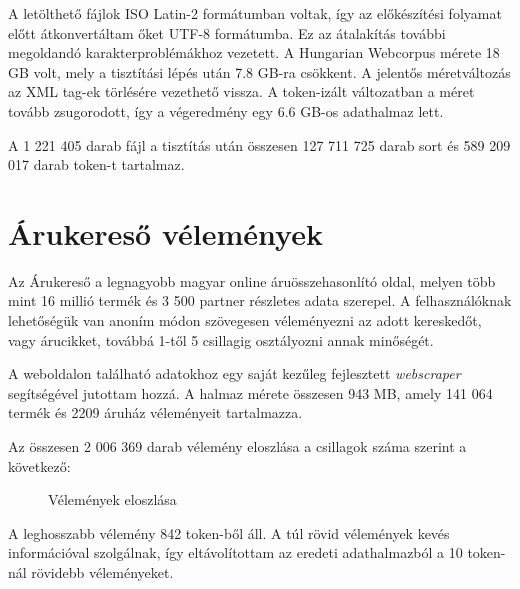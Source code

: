 A letölthető fájlok ISO Latin-2 formátumban voltak, így az előkészítési folyamat előtt átkonvertáltam őket UTF-8 formátumba. Ez az átalakítás további megoldandó karakterproblémákhoz vezetett. A Hungarian Webcorpus mérete 18 GB volt, mely a tisztítási lépés után 7.8 GB-ra csökkent. A jelentős méretváltozás az XML tag-ek törlésére vezethető vissza. A token-izált változatban a méret tovább zsugorodott, így a végeredmény egy 6.6 GB-os adathalmaz lett.

A 1 221 405 darab fájl a tisztítás után összesen 127 711 725 darab sort és 589 209 017 darab token-t tartalmaz.

\section{Árukereső vélemények}
Az Árukereső \cite{arukereso} a legnagyobb magyar online áruösszehasonlító oldal, melyen több mint 16 millió termék és 3 500 partner részletes adata szerepel. A felhasználóknak lehetőségük van anoním módon szövegesen véleményezni az adott kereskedőt, vagy árucikket, továbbá 1-től 5 csillagig osztályozni annak minőségét.

A weboldalon található adatokhoz egy saját kezűleg fejlesztett \textit{webscraper} segítségével jutottam hozzá. A halmaz mérete összesen 943 MB, amely 141 064 termék és 2209 áruház véleményeit tartalmazza. 

Az összesen 2 006 369 darab vélemény eloszlása a csillagok száma szerint a következő:

\begin{figure}[H]
	\centering
	\hspace{5pt}
	\caption{Vélemények eloszlása}
	\label{fig:example-2}
\end{figure}

A leghosszabb vélemény 842 token-ből áll. A túl rövid vélemények kevés információval szolgálnak, így eltávolítottam az eredeti adathalmazból a 10 token-nál rövidebb véleményeket. 

